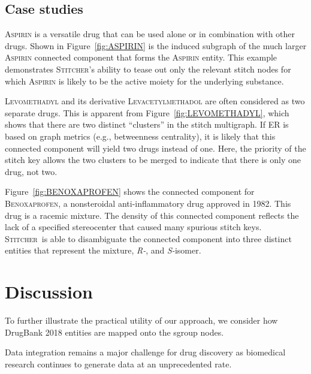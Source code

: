 \documentclass{bmcart}
\newcommand\st{\textsc{Stitcher}}
\begin{document}
\subsection*{Case studies}
\textsc{Aspirin} is a versatile drug that can be used alone or in
combination with other drugs. Shown in Figure~\ref{fig:ASPIRIN} is the
induced subgraph of the much larger \textsc{Aspirin} connected component that
forms the \textsc{Aspirin} entity. This example demonstrates \st's
ability to tease out only the relevant stitch nodes for which
\textsc{Aspirin} is likely to be the active moiety for the underlying
substance. 

\textsc{Levomethadyl} and its derivative \textsc{Levacetylmethadol} are
often considered as two separate drugs. This is apparent from
Figure~\ref{fig:LEVOMETHADYL}, which shows that there are two distinct
``clusters'' in the stitch multigraph. If ER is based on
graph metrics (e.g., betweenness centrality), it is likely that this
connected component will yield two drugs instead of one. Here, the
priority of the stitch key allows the two clusters to be merged to
indicate that there is only one drug, not two.

Figure~\ref{fig:BENOXAPROFEN} shows the connected component for
\textsc{Benoxaprofen}, a nonsteroidal anti-inflammatory drug approved in
1982. This drug is a racemic mixture. The density of this connected
component reflects the lack of a specified stereocenter that
caused many spurious stitch keys. \st\ is able to disambiguate the
connected component into three distinct entities that represent the
mixture, \emph{R-}, and \emph{S-}isomer.

\section*{Discussion}
To further illustrate the practical utility of our approach, we
consider how DrugBank 2018 \cite{wishart2018} entities are mapped onto
the sgroup nodes.

Data integration remains a major challenge for drug discovery as
biomedical research continues to generate data at an unprecedented
rate. 

\end{document}
